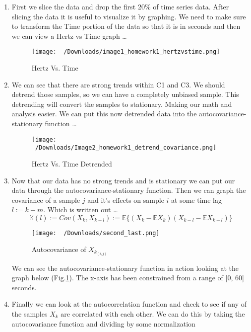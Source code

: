 \documentclass[letter,12pt]{article}
\begin{document}
\begin{enumerate}
	\item First we slice the data and drop the first 20\% of time series data. After slicing the data it is useful to visualize it by graphing. 
		We need to make sure to transform the Time portion of the data so that it is in seconds and then we can view a Hertz vs Time graph \dots
	\begin{figure}[ht]
		\texttt{[image: ~/Downloads/image1\_homework1\_hertzvstime.png]}	
		\caption[First Graph]{Hertz Vs. Time}
	\end{figure}
	\item We can see that there are strong trends within C1 and C3. We should detrend those samples, so we 
	can have a completely unbiased sample. This detrending will convert the samples to stationary. Making our math and 
	analysis easier. We can put this now detrended data into the autocovariance-stationary function \dots
	\begin{figure}[ht]
		\texttt{[image: ~/Downloads/Image2\_homework1\_detrend\_covariance.png]}
		\caption[Second Graph]{Hertz Vs. Time Detrended}
	\end{figure}
	\newpage
	\item Now that our data has no strong trends and is stationary we can put our data through the autocovariance-stationary function.
	Then we can graph the covariance of a sample $j$ and it's effects on sample $i$ at some time lag $l := k-m$.
	Which is written out \dots
	\begin{equation}
		\mathbb{K}(l) := Cov(X_{k},X_{k-l}) := \mathbb{E}\{(X_k - \mathbb{E}X_k)(X_{k-l}-\mathbb{E}X_{k-l})\}
	\end{equation}
	\begin{figure}[ht]
		\texttt{[image: ~/Downloads/second\_last.png]}
		\caption[Third Graph]{Autocovariance of $X_{k_{(i,j)}}$}
		\label{fig:detrend_covariance_graph}
	\end{figure}
	We can see the autocovariance-stationary function in action looking at the graph below (Fig.\ref{fig:detrend_covariance_graph}).
	The x-axis has been constrained from a range of [0, 60] seconds.
	\item Finally we can look at the autocorrelation function and check to see if any of the samples $X_k$ are 
	correlated with each other. We can do this by taking the autocovariance function and dividing by some normalization

\end{enumerate}
\end{document}
